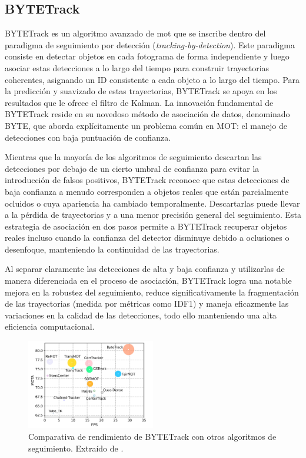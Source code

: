 \documentclass[11pt,spanish,listoffigures,listoftables]{tfgetsinf}
\begin{document}
\subsection{BYTETrack}\label{sec:bytetrack}

BYTETrack \cite{zhang2022bytetrackmultiobjecttrackingassociating} es un algoritmo avanzado de \gls{mot} que se inscribe dentro del paradigma de seguimiento por detección (\textit{tracking-by-detection}). Este paradigma consiste en detectar objetos en cada fotograma de forma independiente y luego asociar estas detecciones a lo largo del tiempo para construir trayectorias coherentes, asignando un ID consistente a cada objeto a lo largo del tiempo. Para la predicción y suavizado de estas trayectorias, BYTETrack se apoya en los resultados que le ofrece el filtro de Kalman. La innovación fundamental de BYTETrack reside en su novedoso método de asociación de datos, denominado BYTE, que aborda explícitamente un problema común en MOT: el manejo de detecciones con baja puntuación de confianza.

Mientras que la mayoría de los algoritmos de seguimiento descartan las detecciones por debajo de un cierto umbral de confianza para evitar la introducción de falsos positivos, BYTETrack reconoce que estas detecciones de baja confianza a menudo corresponden a objetos reales que están parcialmente ocluidos o cuya apariencia ha cambiado temporalmente. Descartarlas puede llevar a la pérdida de trayectorias y a una menor precisión general del seguimiento. Esta estrategia de asociación en dos pasos permite a BYTETrack recuperar objetos reales incluso cuando la confianza del detector disminuye debido a oclusiones o desenfoque, manteniendo la continuidad de las trayectorias. 

Al separar claramente las detecciones de alta y baja confianza y utilizarlas de manera diferenciada en el proceso de asociación, BYTETrack logra una notable mejora en la robustez del seguimiento, reduce significativamente la fragmentación de las trayectorias (medida por métricas como IDF1) y maneja eficazmente las variaciones en la calidad de las detecciones, todo ello manteniendo una alta eficiencia computacional.

\begin{figure}[H]
   \centering
   \includegraphics[width=0.5\textwidth]{images/estado_del_arte/BYTETrack_MOTA.png}
   \caption[Comparativa de rendimiento de BYTETrack con otros algoritmos de seguimiento]{Comparativa de rendimiento de BYTETrack con otros algoritmos de seguimiento. Extraído de \cite[fig. 1, p.~1]{zhang2022bytetrackmultiobjecttrackingassociating}.}
   \label{fig:bytetrack_mota}
\end{figure}
\end{document}

